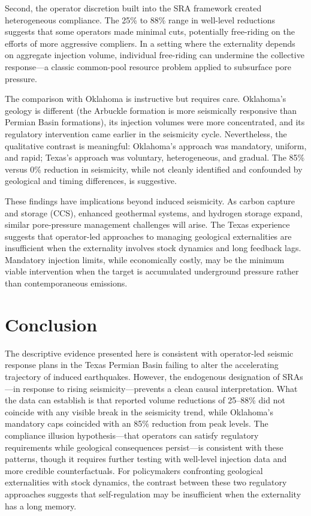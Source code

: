 \documentclass[12pt]{article}
\begin{document}
Second, the operator discretion built into the SRA framework created heterogeneous compliance. The 25\% to 88\% range in well-level reductions suggests that some operators made minimal cuts, potentially free-riding on the efforts of more aggressive compliers. In a setting where the externality depends on aggregate injection volume, individual free-riding can undermine the collective response---a classic common-pool resource problem applied to subsurface pore pressure.

The comparison with Oklahoma is instructive but requires care. Oklahoma's geology is different (the Arbuckle formation is more seismically responsive than Permian Basin formations), its injection volumes were more concentrated, and its regulatory intervention came earlier in the seismicity cycle. Nevertheless, the qualitative contrast is meaningful: Oklahoma's approach was mandatory, uniform, and rapid; Texas's approach was voluntary, heterogeneous, and gradual. The 85\% versus 0\% reduction in seismicity, while not cleanly identified and confounded by geological and timing differences, is suggestive.

These findings have implications beyond induced seismicity. As carbon capture and storage (CCS), enhanced geothermal systems, and hydrogen storage expand, similar pore-pressure management challenges will arise. The Texas experience suggests that operator-led approaches to managing geological externalities are insufficient when the externality involves stock dynamics and long feedback lags. Mandatory injection limits, while economically costly, may be the minimum viable intervention when the target is accumulated underground pressure rather than contemporaneous emissions.

\section{Conclusion}

The descriptive evidence presented here is consistent with operator-led seismic response plans in the Texas Permian Basin failing to alter the accelerating trajectory of induced earthquakes. However, the endogenous designation of SRAs---in response to rising seismicity---prevents a clean causal interpretation. What the data can establish is that reported volume reductions of 25--88\% did not coincide with any visible break in the seismicity trend, while Oklahoma's mandatory caps coincided with an 85\% reduction from peak levels. The compliance illusion hypothesis---that operators can satisfy regulatory requirements while geological consequences persist---is consistent with these patterns, though it requires further testing with well-level injection data and more credible counterfactuals. For policymakers confronting geological externalities with stock dynamics, the contrast between these two regulatory approaches suggests that self-regulation may be insufficient when the externality has a long memory.
\end{document}
